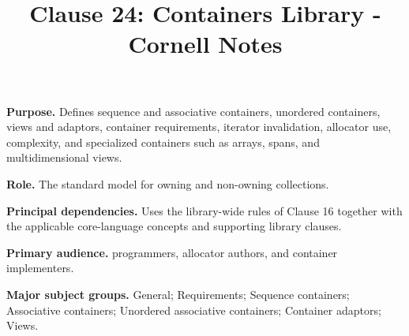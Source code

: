 \documentclass[11pt,letterpaper]{article}
\title{Clause 24: Containers Library - Cornell Notes}
\author{}
\date{}
\begin{document}
\maketitle
\begin{CornellReferenceOrientationBox}
\textbf{Purpose.} Defines sequence and associative containers, unordered containers, views and adaptors, container requirements, iterator invalidation, allocator use, complexity, and specialized containers such as arrays, spans, and multidimensional views.
\par\textbf{Role.} The standard model for owning and non-owning collections.
\par\textbf{Principal dependencies.} Uses the library-wide rules of Clause 16 together with the applicable core-language concepts and supporting library clauses.
\par\textbf{Primary audience.} programmers, allocator authors, and container implementers.
\par\textbf{Major subject groups.} General; Requirements; Sequence containers; Associative containers; Unordered associative containers; Container adaptors; Views.
\end{CornellReferenceOrientationBox}
\end{document}
